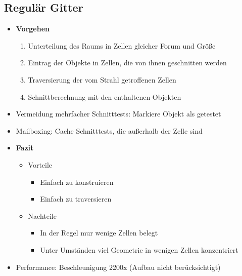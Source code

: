 \subsection{Regulär Gitter}
\begin{itemize}
	\item \textbf{Vorgehen}
	\begin{enumerate}
		\item Unterteilung des Raums in Zellen gleicher Forum und Größe
		\item Eintrag der Objekte in Zellen, die von ihnen geschnitten werden
		\item Traversierung der vom Strahl getroffenen Zellen
		\item Schnittberechnung mit den enthaltenen Objekten
	\end{enumerate}
	\item Vermeidung mehrfacher Schnitttests: Markiere Objekt als getestet
	\item Mailboxing: Cache Schnitttests, die außerhalb der Zelle sind
	\item \textbf{Fazit}
	\begin{itemize}
		\item Vorteile
		\begin{itemize}
			\item Einfach zu konstruieren
			\item Einfach zu traversieren
		\end{itemize}
		\item Nachteile
		\begin{itemize}
			\item In der Regel mur wenige Zellen belegt
			\item Unter Umständen viel Geometrie in wenigen Zellen konzentriert
		\end{itemize}
	\end{itemize}
	\item Performance: Beschleunigung 2200x (Aufbau nicht berücksichtigt)
\end{itemize}


